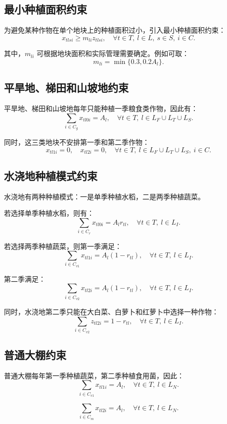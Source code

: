 \documentclass[12pt,a4paper]{ctexart}
\begin{document}
\subsection{最小种植面积约束}

为避免某种作物在单个地块上的种植面积过小，引入最小种植面积约束：
\[
x_{tlsi}\geq m_{li}z_{tlsi},
\quad \forall t\in T,\ l\in L,\ s\in S,\ i\in C.
\]

其中，$m_{li}$ 可根据地块面积和实际管理需要确定。例如可取：
\[
m_{li}=\min\{0.3,0.2A_l\}.
\]

\subsection{平旱地、梯田和山坡地约束}

平旱地、梯田和山坡地每年只能种植一季粮食类作物，因此有：
\[
\sum_{i\in C_g}x_{tl0i}=A_l,
\quad \forall t\in T,\ l\in L_F\cup L_T\cup L_S.
\]

同时，这三类地块不安排第一季和第二季作物：
\[
x_{tl1i}=0,\quad x_{tl2i}=0,
\quad \forall t\in T,\ l\in L_F\cup L_T\cup L_S,\ i\in C.
\]

\subsection{水浇地种植模式约束}

水浇地有两种种植模式：一是单季种植水稻，二是两季种植蔬菜。

若选择单季种植水稻，则有：
\[
\sum_{i\in C_r}x_{tl0i}=A_lr_{tl},
\quad \forall t\in T,\ l\in L_I.
\]

若选择两季种植蔬菜，则第一季满足：
\[
\sum_{i\in C_{v1}}x_{tl1i}=A_l(1-r_{tl}),
\quad \forall t\in T,\ l\in L_I.
\]

第二季满足：
\[
\sum_{i\in C_{v2}}x_{tl2i}=A_l(1-r_{tl}),
\quad \forall t\in T,\ l\in L_I.
\]

同时，水浇地第二季只能在大白菜、白萝卜和红萝卜中选择一种作物：
\[
\sum_{i\in C_{v2}}z_{tl2i}=1-r_{tl},
\quad \forall t\in T,\ l\in L_I.
\]

\subsection{普通大棚约束}

普通大棚每年第一季种植蔬菜，第二季种植食用菌，因此：
\[
\sum_{i\in C_{v1}}x_{tl1i}=A_l,
\quad \forall t\in T,\ l\in L_N.
\]

\[
\sum_{i\in C_m}x_{tl2i}=A_l,
\quad \forall t\in T,\ l\in L_N.
\]
\end{document}
